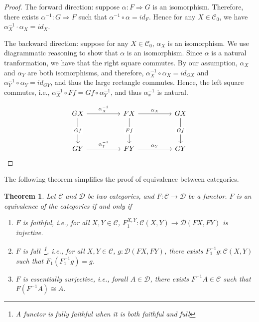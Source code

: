 \documentclass[12pt]{article}
\theoremstyle{plain}
\newtheorem{theorem}{Theorem}
\theoremstyle{definition}
\theoremstyle{remark}
\newcommand{\cat}[1]{\mathcal{#1}}
\begin{document}
\begin{proof}
The forward direction: suppose $\alpha:F \Rightarrow G$ is an isomorphism. Therefore, there exists $\alpha^{-1}:G \Rightarrow F$ such that $\alpha^{-1}\circ \alpha = id_{F}$. Hence for any $X\in \cat{C}_0$, we have $\alpha_X^{-1} \cdot \alpha_X = id_X$.

The backward direction: suppose for any $X\in \cat{C}_0$, $\alpha_X$ is an isomorphism. We use diagrammatic reasoning to show that $\alpha$ is an isomorphism.
Since $\alpha$ is a natural tranformation, we have that the right square commutes.
By our assumption, $\alpha_X$ and $\alpha_Y$ are both isomorphisms, and therefore, $\alpha_X^{-1} \circ \alpha_X = id_{GX}$ and $\alpha_Y^{-1} \circ \alpha_Y = id_{GY}$, and thus the large rectangle commutes. Hence, the left square commutes, i.e., $\alpha_X^{-1} \circ Ff = Gf \circ \alpha_Y^{-1}$, and thus $\alpha_x^{-1}$ is natural. 

\[\begin{tikzcd}
	GX && FX && GX \\
	\\
	GY && FY && GY
	\arrow["{\alpha_X^{-1}}", from=1-1, to=1-3]
	\arrow["Gf"{description}, from=1-1, to=3-1]
	\arrow["{\alpha_X}", from=1-3, to=1-5]
	\arrow["Ff"{description}, from=1-3, to=3-3]
	\arrow["Gf"{description}, from=1-5, to=3-5]
	\arrow["{\alpha_Y^{-1}}", from=3-1, to=3-3]
	\arrow["{\alpha_Y}", from=3-3, to=3-5]
\end{tikzcd}\]

\end{proof}

The following theorem simplifies the proof of equivalence between categories.
\begin{theorem}
Let $\cat C$ and $\cat D$ be two categories, and $F:\cat C \to \cat D$ be a functor. $F$ is an equivalence of the categories if and only if
\begin{enumerate}
    \item $F$ is {\normalfont faithful}, i.e., for all $X,Y \in \cat{C}$, $F_1^{X,Y}:\cat{C}(X,Y) \to \cat{D}(FX, FY)$ is injective.
    \item $F$ is {\normalfont full}~\footnote{A functor is \emph{fully faithful} when it is both faithful and full}, i.e., for all $X, Y \in \cat C$, $g:\cat D(FX, FY)$, there exists $F_1^{-1}g : \cat C(X, Y)$ such that $F_1(F_1^{-1}g) = g$.
    \item $F$ is {\normalfont essentially surjective}, i.e., forall $A\in \cat D$, there exists $F^{-1}A \in \cat C$ such that $F(F^{-1} A) \cong A$.
\end{enumerate}
\end{theorem}
\end{document}
